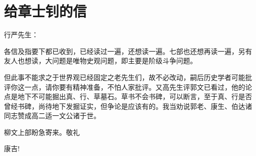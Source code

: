 \section[给章士钊的信（一九六五年七月十八日）]{给章士钊的信}


行严先生：

各信及指要下都已收到，已经读过一遍，还想读一遍。七部也还想再读一遍，另有友人也想读，大问题是唯物史观问题，即主要是阶级斗争问题。

但此事不能求之于世界观已经固定之老先生们，故不必改动，嗣后历史学者可能批评你这一点，请你要有精神准备，不怕人家批评。又高先生评郭文已看过，他的论点是地下不可能掘出真、行、草墓石。草书不会书碑，可以断言，至于真、行是否曾经书碑，尚待地下发掘证实，但争论是应该有的。我当劝说郭老、康生、伯达诸同志赞成高二适一文公诸于世。

柳文上部盼急寄来。敬礼

康吉!



